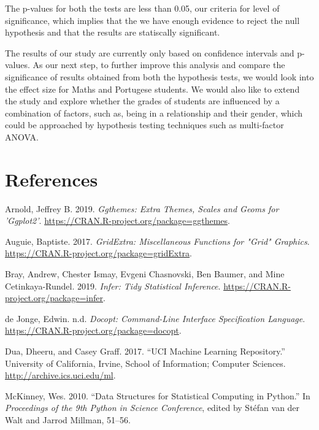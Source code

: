 \documentclass[]{article}
\begin{document}
The p-values for both the tests are less than 0.05, our criteria for
level of significance, which implies that the we have enough evidence to
reject the null hypothesis and that the results are statiscally
significant.

The results of our study are currently only based on confidence
intervals and p-values. As our next step, to further improve this
analysis and compare the significance of results obtained from both the
hypothesis tests, we would look into the effect size for Maths and
Portugese students. We would also like to extend the study and explore
whether the grades of students are influenced by a combination of
factors, such as, being in a relationship and their gender, which could
be approached by hypothesis testing techniques such as multi-factor
ANOVA.

\hypertarget{references}{%
\section*{References}\label{references}}

\hypertarget{refs}{}
\leavevmode\hypertarget{ref-ggthemes}{}%
Arnold, Jeffrey B. 2019. \emph{Ggthemes: Extra Themes, Scales and Geoms
for 'Ggplot2'}. \url{https://CRAN.R-project.org/package=ggthemes}.

\leavevmode\hypertarget{ref-grid_extra}{}%
Auguie, Baptiste. 2017. \emph{GridExtra: Miscellaneous Functions for
"Grid" Graphics}. \url{https://CRAN.R-project.org/package=gridExtra}.

\leavevmode\hypertarget{ref-infer}{}%
Bray, Andrew, Chester Ismay, Evgeni Chasnovski, Ben Baumer, and Mine
Cetinkaya-Rundel. 2019. \emph{Infer: Tidy Statistical Inference}.
\url{https://CRAN.R-project.org/package=infer}.

\leavevmode\hypertarget{ref-docopt}{}%
de Jonge, Edwin. n.d. \emph{Docopt: Command-Line Interface Specification
Language}. \url{https://CRAN.R-project.org/package=docopt}.

\leavevmode\hypertarget{ref-Dua:2019}{}%
Dua, Dheeru, and Casey Graff. 2017. ``UCI Machine Learning Repository.''
University of California, Irvine, School of Information; Computer
Sciences. \url{http://archive.ics.uci.edu/ml}.

\leavevmode\hypertarget{ref-pandas}{}%
McKinney, Wes. 2010. ``Data Structures for Statistical Computing in
Python.'' In \emph{Proceedings of the 9th Python in Science Conference},
edited by Stéfan van der Walt and Jarrod Millman, 51--56.
\end{document}

